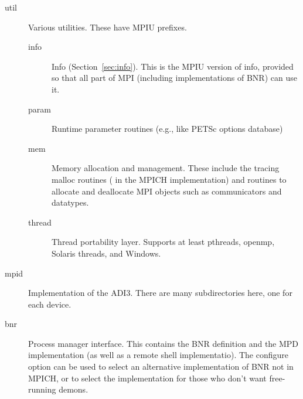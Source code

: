 \documentclass{article}
\begin{document}
\begin{description}
\begin{description}
  \item[util]Various utilities.  These have MPIU prefixes.
    \begin{description}
    \item[info]Info (Section~\ref{sec:info}).  This is the MPIU
    version of info, provided so 
    that all part of MPI (including implementations of BNR) can use it.
    \item[param]Runtime parameter routines (e.g., like PETSc options database)
    \item[mem]Memory allocation and management.  These include the tracing
      malloc routines ( in the MPICH implementation) and
    routines to allocate and deallocate MPI objects such as
    communicators and datatypes.
    \item[thread]Thread portability layer.  Supports at least pthreads,
      openmp, Solaris threads, and Windows.
    \end{description}
  \item[mpid]Implementation of the ADI3.  There are many
    subdirectories here, one for each device.
  \item[bnr]Process manager interface.  This contains the BNR
      definition and the MPD implementation (as well as a remote shell
      implementatio).  The configure option
       can be used to select an alternative
      implementation of BNR not in MPICH, or to select the
       implementation for those who don't want
      free-running demons.


\end{description}
\end{description}
\end{document}
